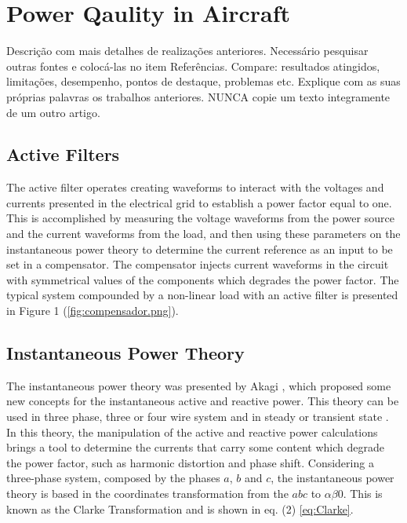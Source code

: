 \section{Power Qaulity in Aircraft}

Descrição com mais detalhes de realizações anteriores. Necessário pesquisar outras fontes e colocá-las no item Referências.
 Compare: resultados atingidos, limitações, desempenho, pontos de destaque, problemas etc. Explique com as suas próprias palavras os trabalhos anteriores. 
NUNCA copie um texto integramente de um outro artigo.

\subsection{Active Filters}

The active filter operates creating waveforms to interact with the voltages and currents presented in the electrical grid to establish a power factor equal to one. This is accomplished by measuring the voltage waveforms from the power source and the current waveforms from the load, and then using these parameters on the instantaneous power theory to determine the current reference as an input to be set in a compensator. The compensator injects current waveforms in the circuit with symmetrical values of the components which degrades the power factor. The typical system compounded by a non-linear load with an active filter is presented in Figure 1 (\ref{fig:compensador.png}).


\subsection{Instantaneous Power Theory}

The instantaneous power theory was presented by Akagi \cite{Akagi}, which proposed some new concepts for the instantaneous active and reactive power. This theory can be used in three phase, three or four wire system and in steady or transient state \cite{Akagi,Akagi}. In this theory, the manipulation of the active and reactive power calculations brings a tool to determine the currents that carry some content which degrade the power factor, such as harmonic distortion and phase shift.
Considering a three-phase system, composed by the phases $a$, $b$ and $c$, the instantaneous power theory is based in the coordinates transformation from the $abc$ to $\alpha \beta 0 $. This is known as the Clarke Transformation and is shown in eq. (2) \ref{eq:Clarke}.

